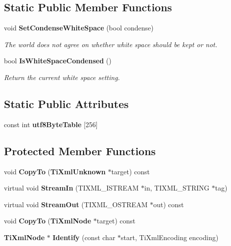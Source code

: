 \subsection*{Static Public Member Functions}
\begin{CompactItemize}
\item 
void {\bf Set\-Condense\-White\-Space} (bool condense)
\begin{CompactList}\small\item\em The world does not agree on whether white space should be kept or not. \item\end{CompactList}\item 
bool {\bf Is\-White\-Space\-Condensed} ()\label{classTiXmlBase_TiXmlUnknowne1}

\begin{CompactList}\small\item\em Return the current white space setting. \item\end{CompactList}\end{CompactItemize}
\subsection*{Static Public Attributes}
\begin{CompactItemize}
\item 
const int {\bf utf8Byte\-Table} [256]
\end{CompactItemize}
\subsection*{Protected Member Functions}
\begin{CompactItemize}
\item 
void {\bf Copy\-To} ({\bf Ti\-Xml\-Unknown} $\ast$target) const\label{classTiXmlUnknown_TiXmlUnknownb0}

\item 
virtual void {\bf Stream\-In} (TIXML\_\-ISTREAM $\ast$in, TIXML\_\-STRING $\ast$tag)\label{classTiXmlUnknown_TiXmlUnknownb1}

\item 
virtual void {\bf Stream\-Out} (TIXML\_\-OSTREAM $\ast$out) const\label{classTiXmlUnknown_TiXmlUnknownb2}

\item 
void {\bf Copy\-To} ({\bf Ti\-Xml\-Node} $\ast$target) const\label{classTiXmlNode_TiXmlUnknownb3}

\item 
{\bf Ti\-Xml\-Node} $\ast$ {\bf Identify} (const char $\ast$start, Ti\-Xml\-Encoding encoding)\label{classTiXmlNode_TiXmlUnknownb4}

\end{CompactItemize}
